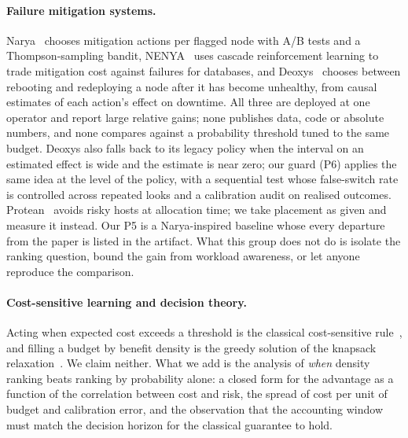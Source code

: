 \paragraph{Failure mitigation systems.}
Narya~\cite{levy2020narya} chooses mitigation actions per flagged node with A/B tests and a
Thompson-sampling bandit, NENYA~\cite{wang2022nenya} uses cascade reinforcement learning to trade
mitigation cost against failures for databases, and Deoxys~\cite{zhang2024deoxys} chooses
between rebooting and redeploying a node after it has become unhealthy, from causal estimates of
each action's effect on downtime. All three are deployed at one operator and report large
relative gains; none publishes data, code or absolute numbers, and none compares against a
probability threshold tuned to the same budget. Deoxys also falls back to its legacy policy when
the interval on an estimated effect is wide and the estimate is near zero; our guard (P6) applies
the same idea at the level of the policy, with a sequential test whose false-switch rate is
controlled across repeated looks and a calibration audit on realised outcomes. Protean~\cite{hadary2020protean} avoids
risky hosts at allocation time; we take placement as given and measure it instead. Our P5 is a
Narya-inspired baseline whose every departure from the paper is listed in the artifact. What this
group does not do is isolate the ranking question, bound the gain from workload awareness, or let
anyone reproduce the comparison.

\paragraph{Cost-sensitive learning and decision theory.}
Acting when expected cost exceeds a threshold is the classical cost-sensitive
rule~\cite{elkan2001foundations}, and filling a budget by benefit density is the greedy solution
of the knapsack relaxation~\cite{dantzig1957discrete}. We claim neither. What we add is the
analysis of \emph{when} density ranking beats ranking by probability alone: a closed form for the
advantage as a function of the correlation between cost and risk, the spread of cost per unit of
budget and calibration error, and the observation that the accounting window must match the
decision horizon for the classical guarantee to hold.

